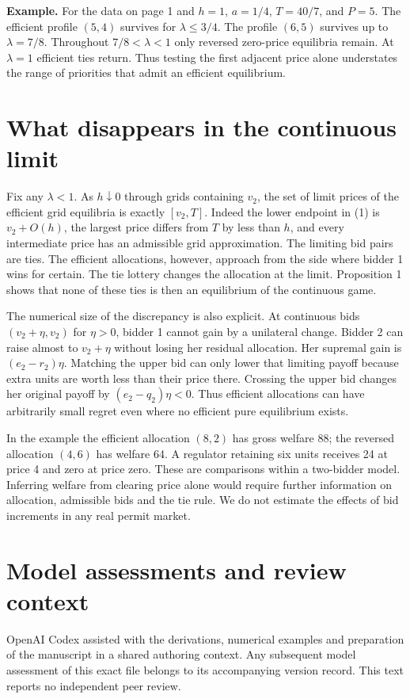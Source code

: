 \documentclass[11pt]{article}
\begin{document}
\textbf{Example.} For the data on page 1 and $h=1$, $a=1/4$, $T=40/7$, and $P=5$. The efficient profile $(5,4)$ survives for $\lambda\le3/4$. The profile $(6,5)$ survives up to $\lambda=7/8$. Throughout $7/8<\lambda<1$ only reversed zero-price equilibria remain. At $\lambda=1$ efficient ties return. Thus testing the first adjacent price alone understates the range of priorities that admit an efficient equilibrium.
\newpage
\section{What disappears in the continuous limit}
Fix any $\lambda<1$. As $h\downarrow0$ through grids containing $v_2$, the set of limit prices of the efficient grid equilibria is exactly $[v_2,T]$. Indeed the lower endpoint in (1) is $v_2+O(h)$, the largest price differs from $T$ by less than $h$, and every intermediate price has an admissible grid approximation. The limiting bid pairs are ties. The efficient allocations, however, approach from the side where bidder 1 wins for certain. The tie lottery changes the allocation at the limit. Proposition 1 shows that none of these ties is then an equilibrium of the continuous game.

The numerical size of the discrepancy is also explicit. At continuous bids $(v_2+\eta,v_2)$ for $\eta>0$, bidder 1 cannot gain by a unilateral change. Bidder 2 can raise almost to $v_2+\eta$ without losing her residual allocation. Her supremal gain is $(e_2-r_2)\eta$. Matching the upper bid can only lower that limiting payoff because extra units are worth less than their price there. Crossing the upper bid changes her original payoff by $(e_2-q_2)\eta<0$. Thus efficient allocations can have arbitrarily small regret even where no efficient pure equilibrium exists.

In the example the efficient allocation $(8,2)$ has gross welfare 88; the reversed allocation $(4,6)$ has welfare 64. A regulator retaining six units receives 24 at price 4 and zero at price zero. These are comparisons within a two-bidder model. Inferring welfare from clearing price alone would require further information on allocation, admissible bids and the tie rule. We do not estimate the effects of bid increments in any real permit market.

\section*{Model assessments and review context}
OpenAI Codex assisted with the derivations, numerical examples and preparation of the manuscript in a shared authoring context. Any subsequent model assessment of this exact file belongs to its accompanying version record. This text reports no independent peer review.
\end{document}

